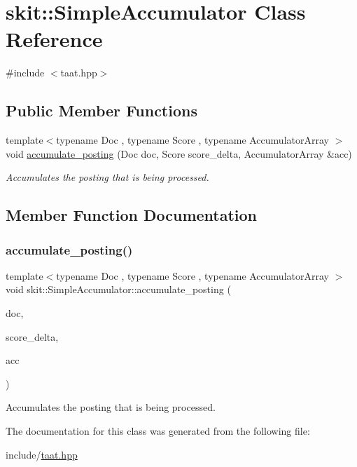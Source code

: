 \hypertarget{classskit_1_1SimpleAccumulator}{}\section{skit\+:\+:Simple\+Accumulator Class Reference}
\label{classskit_1_1SimpleAccumulator}


{\ttfamily \#include $<$taat.\+hpp$>$}

\subsection*{Public Member Functions}
\begin{DoxyCompactItemize}
\item 
{\footnotesize template$<$typename Doc , typename Score , typename Accumulator\+Array $>$ }\\void \hyperlink{classskit_1_1SimpleAccumulator_a4443ac1fdc014104be677f80c6c7b0e8}{accumulate\+\_\+posting} (Doc doc, Score score\+\_\+delta, Accumulator\+Array \&acc)
\begin{DoxyCompactList}\small\item\em Accumulates the posting that is being processed. \end{DoxyCompactList}\end{DoxyCompactItemize}


\subsection{Member Function Documentation}
\mbox{\label{classskit_1_1SimpleAccumulator_a4443ac1fdc014104be677f80c6c7b0e8}} 
\subsubsection{\texorpdfstring{accumulate\+\_\+posting()}{accumulate\_posting()}}
{\footnotesize\ttfamily template$<$typename Doc , typename Score , typename Accumulator\+Array $>$ \\
void skit\+::\+Simple\+Accumulator\+::accumulate\+\_\+posting (\begin{DoxyParamCaption}\item[{Doc}]{doc,  }\item[{Score}]{score\+\_\+delta,  }\item[{Accumulator\+Array \&}]{acc }\end{DoxyParamCaption})\hspace{0.3cm}{\ttfamily [inline]}}



Accumulates the posting that is being processed. 



The documentation for this class was generated from the following file\+:\begin{DoxyCompactItemize}
\item 
include/\hyperlink{taat_8hpp}{taat.\+hpp}\end{DoxyCompactItemize}
